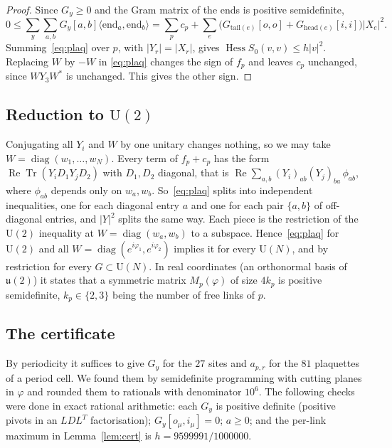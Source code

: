 \documentclass[11pt]{amsart}
\theoremstyle{definition}
\theoremstyle{remark}
\newcommand{\Tr}{\operatorname{Tr}}
\renewcommand{\Re}{\operatorname{Re}}
\newcommand{\Hess}{\operatorname{Hess}}
\newcommand{\U}{\mathrm{U}}
\newcommand{\ip}[2]{\langle #1,#2\rangle}
\begin{document}
\begin{proof}
Since $G_y\ge0$ and the Gram matrix of the ends is positive semidefinite,
\[
0\le\sum_y\sum_{a,b}G_y[a,b]\ip{\mathrm{end}_a}{\mathrm{end}_b}
=\sum_pc_p+\sum_e\big(G_{\mathrm{tail}(e)}[o,o]+G_{\mathrm{head}(e)}[i,i]\big)|X_e|^2 .
\]
Summing~\eqref{eq:plaq} over $p$, with $|Y_r|=|X_r|$, gives $\Hess S_0(v,v)\le h|v|^2$. Replacing $W$ by $-W$ in
\eqref{eq:plaq} changes the sign of $f_p$ and leaves $c_p$ unchanged, since $WY_3W^*$ is unchanged. This gives the
other sign.
\end{proof}

\subsection{Reduction to \texorpdfstring{$\U(2)$}{U(2)}}
Conjugating all $Y_i$ and $W$ by one unitary changes nothing, so we may take $W=\operatorname{diag}(w_1,\dots,w_N)$.
Every term of $f_p+c_p$ has the form $\Re\Tr(Y_iD_1Y_jD_2)$ with $D_1,D_2$ diagonal, that is
$\Re\sum_{a,b}(Y_i)_{ab}(Y_j)_{ba}\,\phi_{ab}$, where $\phi_{ab}$ depends only on $w_a,w_b$. So~\eqref{eq:plaq}
splits into independent inequalities, one for each diagonal entry $a$ and one for each pair $\{a,b\}$ of
off-diagonal entries, and $|Y|^2$ splits the same way. Each piece is the restriction of the $\U(2)$ inequality at
$W=\operatorname{diag}(w_a,w_b)$ to a subspace. Hence~\eqref{eq:plaq} for $\U(2)$ and all
$W=\operatorname{diag}(e^{i\varphi_1},e^{i\varphi_2})$ implies it for every $\U(N)$, and by restriction for every
$G\subset\U(N)$. In real coordinates (an orthonormal basis of $\mathfrak u(2)$) it states that a symmetric matrix
$M_p(\varphi)$ of size $4k_p$ is positive semidefinite, $k_p\in\{2,3\}$ being the number of free links of $p$.

\subsection{The certificate}
By periodicity it suffices to give $G_y$ for the $27$ sites and $a_{p,r}$ for the $81$ plaquettes of a period cell.
We found them by semidefinite programming with cutting planes in $\varphi$ and rounded them to rationals with
denominator $10^6$. The following checks were done in exact rational arithmetic: each $G_y$ is positive definite
(positive pivots in an $LDL^{T}$ factorisation); $G_y[o_\mu,i_\mu]=0$; $a\ge0$; and the per-link maximum in
Lemma~\ref{lem:cert} is $h=9599991/1000000$.
\end{document}
